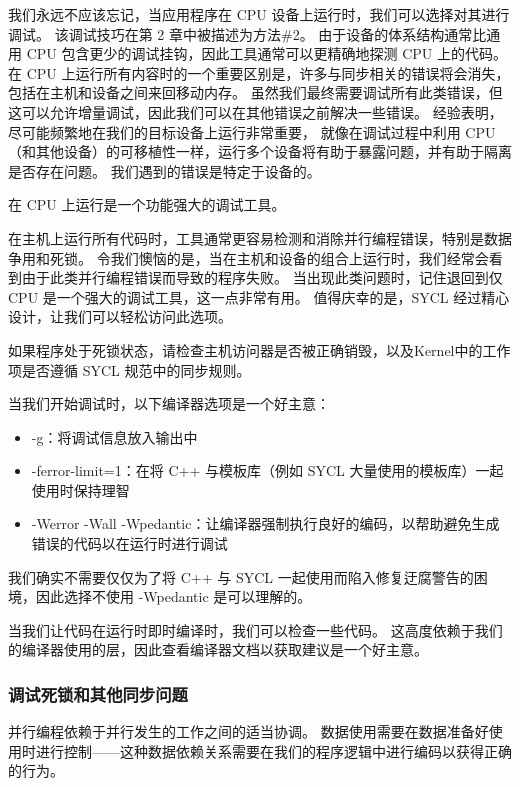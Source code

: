 我们永远不应该忘记，当应用程序在 CPU 设备上运行时，我们可以选择对其进行调试。 
该调试技巧在第 2 章中被描述为方法\#2。
由于设备的体系结构通常比通用 CPU 包含更少的调试挂钩，因此工具通常可以更精确地探测 CPU 上的代码。 
在 CPU 上运行所有内容时的一个重要区别是，许多与同步相关的错误将会消失，包括在主机和设备之间来回移动内存。 
虽然我们最终需要调试所有此类错误，但这可以允许增量调试，因此我们可以在其他错误之前解决一些错误。 
经验表明，尽可能频繁地在我们的目标设备上运行非常重要，
就像在调试过程中利用 CPU（和其他设备）的可移植性一样，运行多个设备将有助于暴露问题，并有助于隔离是否存在问题。 
我们遇到的错误是特定于设备的。

\begin{remark}[调试提示]
在 CPU 上运行是一个功能强大的调试工具。
\end{remark}

在主机上运行所有代码时，工具通常更容易检测和消除并行编程错误，特别是数据争用和死锁。 
令我们懊恼的是，当在主机和设备的组合上运行时，我们经常会看到由于此类并行编程错误而导致的程序失败。 
当出现此类问题时，记住退回到仅 CPU 是一个强大的调试工具，这一点非常有用。 
值得庆幸的是，SYCL 经过精心设计，让我们可以轻松访问此选项。

\begin{remark}[调试提示]
如果程序处于死锁状态，请检查主机访问器是否被正确销毁，以及Kernel中的工作项是否遵循 SYCL 规范中的同步规则。
\end{remark}

当我们开始调试时，以下编译器选项是一个好主意：

\begin{itemize}
	\item -g：将调试信息放入输出中

	\item -ferror-limit=1：在将 C++ 与模板库（例如 SYCL 大量使用的模板库）一起使用时保持理智

	\item -Werror -Wall -Wpedantic：让编译器强制执行良好的编码，以帮助避免生成错误的代码以在运行时进行调试
\end{itemize}

我们确实不需要仅仅为了将 C++ 与 SYCL 一起使用而陷入修复迂腐警告的困境，因此选择不使用 -Wpedantic 是可以理解的。

当我们让代码在运行时即时编译时，我们可以检查一些代码。 
这高度依赖于我们的编译器使用的层，因此查看编译器文档以获取建议是一个好主意。

\subsubsection{调试死锁和其他同步问题}
并行编程依赖于并行发生的工作之间的适当协调。 
数据使用需要在数据准备好使用时进行控制——这种数据依赖关系需要在我们的程序逻辑中进行编码以获得正确的行为。

